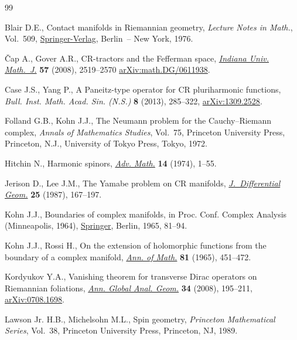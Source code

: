 \begin{thebibliography}{99}
\footnotesize\itemsep=0pt

Blair D.E., Contact manifolds in {R}iemannian geometry, \textit{Lecture Notes
 in Math.}, Vol.~509, \href{https://doi.org/10.1007/BFb0079307}{Springer-Verlag}, Berlin~-- New York, 1976.


\v{C}ap A., Gover A.R., C{R}-tractors and the {F}efferman space,
 \href{https://doi.org/10.1512/iumj.2008.57.3359}{\textit{Indiana Univ. Math.~J.}} \textbf{57} (2008), 2519--2570 \href{https://arxiv.org/abs/math.DG/0611938}{arXiv:math.DG/0611938}.

Case J.S., Yang P., A {P}aneitz-type operator for {CR} pluriharmonic functions,
 \textit{Bull. Inst. Math. Acad. Sin. (N.S.)} \textbf{8} (2013), 285--322,
 \href{https://arxiv.org/abs/1309.2528}{arXiv:1309.2528}.

Folland G.B., Kohn J.J., The {N}eumann problem for the {C}auchy--{R}iemann
 complex, \textit{Annals of Mathematics Studies}, Vol.~75, Princeton
 University Press, Princeton, N.J., University of Tokyo Press, Tokyo, 1972.

Hitchin N., Harmonic spinors, \href{https://doi.org/10.1016/0001-8708(74)90021-8}{\textit{Adv. Math.}} \textbf{14} (1974), 1--55.

Jerison D., Lee J.M., The {Y}amabe problem on {CR} manifolds,
 \href{https://doi.org/10.4310/jdg/1214440849}{\textit{J.~Differential Geom.}} \textbf{25} (1987), 167--197.

Kohn J.J., Boundaries of complex manifolds, in Proc. {C}onf. {C}omplex
 {A}nalysis ({M}inneapolis, 1964), \href{https://doi.org/10.1007/978-3-642-48016-4_9}{Springer}, Berlin, 1965, 81--94.

Kohn J.J., Rossi H., On the extension of holomorphic functions from the
 boundary of a complex manifold, \href{https://doi.org/10.2307/1970624}{\textit{Ann. of Math.}} \textbf{81} (1965),
 451--472.

Kordyukov Y.A., Vanishing theorem for transverse {D}irac operators on
 {R}iemannian foliations, \href{https://doi.org/10.1007/s10455-008-9103-2}{\textit{Ann. Global Anal. Geom.}} \textbf{34} (2008),
 195--211, \href{https://arxiv.org/abs/0708.1698}{arXiv:0708.1698}.

Lawson Jr. H.B., Michelsohn M.L., Spin geometry, \textit{Princeton Mathematical
 Series}, Vol.~38, Princeton University Press, Princeton, NJ, 1989.


\end{thebibliography}
